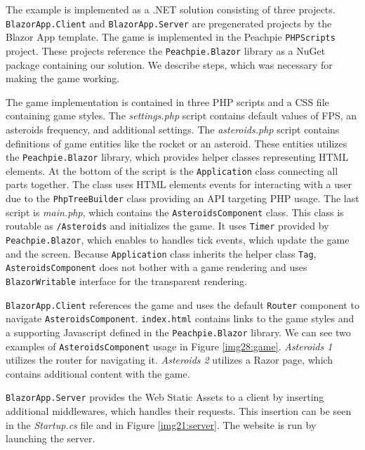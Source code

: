 \par
The example is implemented as a .NET solution consisting of three projects. 
\texttt{BlazorApp.Client} and \texttt{BlazorApp.Server} are pregenerated projects by the Blazor App template.
The game is implemented in the Peachpie \texttt{PHPScripts} project.
These projects reference the \texttt{Peachpie.Blazor} library as a NuGet package containing our solution. 
We describe steps, which was necessary for making the game working.
\par
The game implementation is contained in three PHP scripts and a CSS file containing game styles.
The \textit{settings.php} script contains default values of FPS, an asteroids frequency, and additional settings.
The \textit{asteroids.php} script contains definitions of game entities like the rocket or an asteroid.
These entities utilizes the \texttt{Peachpie.Blazor} library, which provides helper classes representing HTML elements.
At the bottom of the script is the \texttt{Application} class connecting all parts together.
The class uses HTML elements events for interacting with a user due to the \texttt{PhpTreeBuilder} class providing an API targeting PHP usage.
The last script is \textit{main.php}, which contains the \texttt{AsteroidsComponent} class.
This class is routable as \texttt{/Asteroids} and initializes the game.
It uses \texttt{Timer} provided by \texttt{Peachpie.Blazor}, which enables to handles tick events, which update the game and the screen.
Because \texttt{Application} class inherits the helper class \texttt{Tag}, \texttt{AsteroidsComponent} does not bother with a game rendering and uses \texttt{BlazorWritable} interface for the transparent rendering.
\par
\texttt{BlazorApp.Client} references the game and uses the default \texttt{Router} component to navigate \texttt{AsteroidsComponent}.
\texttt{index.html} contains links to the game styles and a supporting Javascript defined in the \texttt{Peachpie.Blazor} library.
We can see two examples of \texttt{AsteroidsComponent} usage in Figure \ref{img28:game}.
\textit{Asteroids 1} utilizes the router for navigating it.
\textit{Asteroids 2} utilizes a Razor page, which contains additional content with the game.
\par
\texttt{BlazorApp.Server} provides the Web Static Assets to a client by inserting additional middlewares, which handles their requests.
This insertion can be seen in the \textit{Startup.cs} file and in Figure \ref{img21:server}.
The website is run by launching the server.
\par
